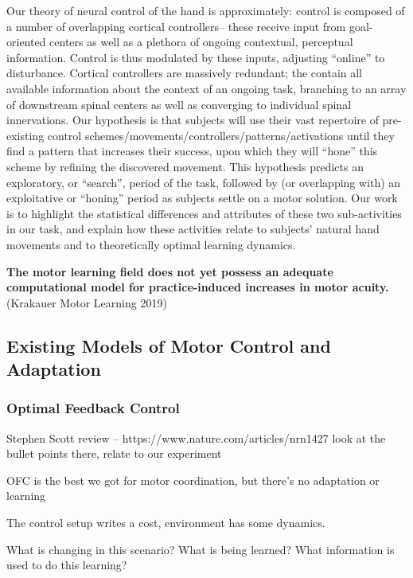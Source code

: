 \documentclass[../main.tex]{subfiles}
\begin{document}
Our theory of neural control of the hand is approximately: control is composed of a number of overlapping cortical controllers– these receive input from goal-oriented centers as well as a plethora of ongoing contextual, perceptual information. Control is thus modulated by these inputs, adjusting “online” to disturbance. Cortical controllers are massively redundant; the contain all available information about the context of an ongoing task, branching to an array of downstream spinal centers as well as converging to individual spinal innervations. Our hypothesis is that subjects will use their vast repertoire of pre-existing control schemes/movements/controllers/patterns/activations until they find a pattern that increases their success, upon which they will “hone” this scheme by refining the discovered movement. This hypothesis predicts an exploratory, or “search”, period of the task, followed by (or overlapping with) an exploitative or “honing” period as subjects settle on a motor solution. Our work is to highlight the statistical differences and attributes of these two sub-activities in our task, and explain how these activities relate to subjects’ natural hand movements and to theoretically optimal learning dynamics.


\textbf{The motor learning field does not yet possess an adequate
computational model for practice-induced increases in motor acuity.}
(Krakauer Motor Learning 2019)

\subsection{Existing Models of Motor Control and Adaptation}\label{existing-models-of-motor-control-and-adaptation}

\subsubsection{Optimal Feedback Control}\label{optimal-feedback-control}

Stephen Scott review -- https://www.nature.com/articles/nrn1427 look at
the bullet points there, relate to our experiment

OFC is the best we got for motor coordination, but there's no adaptation
or learning

The control setup writes a cost, environment has some dynamics.

What is changing in this scenario? What is being learned? What
information is used to do this learning?
\end{document}
